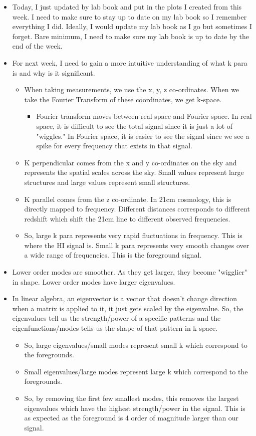 \begin{itemize}
    \item Today, I just updated by lab book and put in the plots I created from this week. I need to make sure to stay up to date on my lab book so I remember everything I did. Ideally, I would update my lab book as I go but sometimes I forget. Bare minimum, I need to make sure my lab book is up to date by the end of the week.
    \item For next week, I need to gain a more intuitive understanding of what k para is and why is it significant.
    \begin{itemize}
        \item When taking measurements, we use the x, y, z co-ordinates. When we take the Fourier Transform of these coordinates, we get k-space.
        \begin{itemize}
            \item Fourier transform moves between real space and Fourier space. In real space, it is difficult to see the total signal since it is just a lot of "wiggles." In Fourier space, it is easier to see the signal since we see a spike for every frequency that exists in that signal.
        \end{itemize}
        \item  K perpendicular comes from the x and y co-ordinates on the sky and represents the spatial scales across the sky. Small values represent large structures and large values represent small structures.
        \item K parallel comes from the z co-ordinate. In 21cm cosmology, this is directly mapped to frequency. Different distances corresponds to different redshift which shift the 21cm line to different observed frequencies. 
        \item So, large k para represents very rapid fluctuations in frequency. This is where the HI signal is. Small k para represents very smooth changes over a wide range of frequencies. This is the foreground signal.
    \end{itemize}
\item Lower order modes are smoother. As they get larger, they become "wigglier" in shape. Lower order modes have larger eigenvalues. 
\item In linear algebra, an eigenvector is a vector that doesn't change direction when a matrix is applied to it, it just gets scaled by the eigenvalue. So, the eigenvalues tell us the strength/power of a specific patterns and the eigenfunctions/modes tells us the shape of that pattern in k-space.
\begin{itemize}
    \item So, large eigenvalues/small modes represent small k which correspond to the foregrounds.
    \item Small eigenvalues/large modes represent large k which correspond to the foregrounds.
    \item So, by removing the first few smallest modes, this removes the largest eigenvalues which have the highest strength/power in the signal. This is as expected as the foreground is 4 order of magnitude larger than our signal. 
\end{itemize}
\end{itemize}

